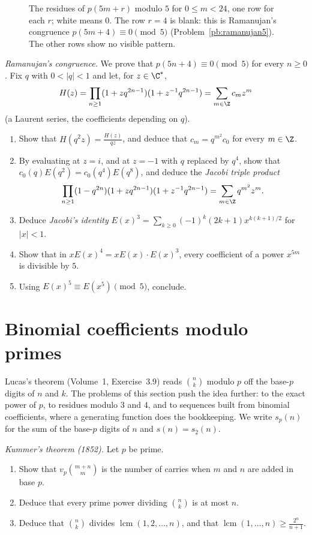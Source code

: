 \begin{figure}[ht]
\centering
{}
\caption{The residues of $p(5m+r)$ modulo $5$ for $0\le m<24$, one row for each $r$; white means $0$. The row $r=4$ is blank: this is
Ramanujan's congruence $p(5m+4)\equiv0\pmod5$ (Problem~\ref{pb:ramanujan5}). The other rows show no visible pattern.}
\label{fig:ramanujan}
\end{figure}

\begin{exercise}[Journey]\label{pb:ramanujan5}
\emph{Ramanujan's congruence.} We prove that $p(5n+4)\equiv0\pmod5$ for every $n\ge0$. Fix $q$ with $0<|q|<1$ and let, for
$z\in\C^*$,
\[
H(z)=\prod_{n\ge1}(1+zq^{2n-1})(1+z^{-1}q^{2n-1})=\sum_{m\in\Z}c_mz^m
\]
(a Laurent series, the coefficients depending on $q$).
\begin{enumerate}[label=(\alph*)]
\item Show that $H(q^2z)=\frac{H(z)}{qz}$, and deduce that $c_m=q^{m^2}c_0$ for every $m\in\Z$.
\item By evaluating at $z=i$, and at $z=-1$ with $q$ replaced by $q^4$, show that $c_0(q)E(q^2)=c_0(q^4)E(q^8)$, and deduce the
\emph{Jacobi triple product}
\[
\prod_{n\ge1}(1-q^{2n})(1+zq^{2n-1})(1+z^{-1}q^{2n-1})=\sum_{m\in\Z}q^{m^2}z^m.
\]
\item Deduce \emph{Jacobi's identity} $E(x)^3=\sum_{k\ge0}(-1)^k(2k+1)x^{k(k+1)/2}$ for $|x|<1$.
\item Show that in $xE(x)^4=xE(x)\cdot E(x)^3$, every coefficient of a power $x^{5m}$ is divisible by $5$.
\item Using $E(x)^5\equiv E(x^5)\pmod5$, conclude.
\end{enumerate}
\end{exercise}

\section{Binomial coefficients modulo primes}

Lucas's theorem (Volume~1, Exercise~3.9) reads $\binom nk$ modulo $p$ off the base-$p$ digits of $n$ and $k$. The problems of this
section push the idea further: to the exact power of $p$, to residues modulo $3$ and $4$, and to sequences built from
binomial coefficients, where a generating function does the bookkeeping. We write $s_p(n)$ for the sum of the base-$p$ digits
of $n$ and $s(n)=s_2(n)$.

\begin{exercise}[$\star\star$]\label{pb:kummer}
\emph{Kummer's theorem (1852).} Let $p$ be prime.
\begin{enumerate}[label=(\alph*)]
\item Show that $v_p\binom{m+n}m$ is the number of carries when $m$ and $n$ are added in base $p$.
\item Deduce that every prime power dividing $\binom nk$ is at most $n$.
\item Deduce that $\binom nk$ divides $\operatorname{lcm}(1,2,\dots,n)$, and that $\operatorname{lcm}(1,\dots,n)\ge\frac{2^n}{n+1}$.
\end{enumerate}
\end{exercise}


